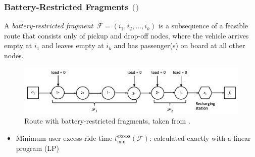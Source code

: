 \documentclass[aspectratio=1610]{beamer}
\newcommand{\important}[1]{{\color{green!60!black}#1}}
\let\oldfootnotesize\footnotesize
\renewcommand*{\footnotesize}{\oldfootnotesize\fontsize{6}{4}\selectfont}
\renewcommand{\footnotesize}{\scriptsize}
\begin{document}
\begin{frame}
  \frametitle{Battery-Restricted Fragments {\footnotesize{\textcolor{gray}{(\cite{Su:2023})}}}}
  
\begin{definition}
	A \important{\emph{battery-restricted fragment}}~$\mathcal{F} = (i_1, i_2, \dots, i_k)$ is a subsequence of a feasible route that consists only of \important{pickup and drop-off nodes}, where the vehicle \important{arrives empty} at $i_1$ and \important{leaves empty} at $i_k$ and has passenger(s) on board at all other nodes.
\end{definition}

\begin{figure}
	\centering
	\includegraphics[scale=0.3]{graphics/battery-restricted-fragment-example.png}
	\caption{Route with battery-restricted fragments, taken from \cite{Su:2023}.}
\end{figure}

\begin{itemize}
	\item Minimum user excess ride time $t^{\mathrm{excess}}_{\mathrm{min}}(\mathcal{F})$: calculated exactly with a linear program (LP)
\end{itemize}

\end{frame}
\end{document}
